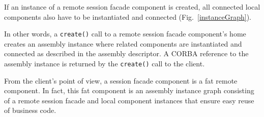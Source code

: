 If an instance of a remote session facade component is created, all connected local 
components also have to be instantiated and connected (Fig.~\ref{instanceGraph}). 

In other words, a {\tt create()} call to a remote session facade component's home 
creates an assembly instance where related components are instantiated and connected 
as described in the assembly descriptor. 
A CORBA reference to the assembly instance is returned by the {\tt create()} 
call to the client.

From the client's point of view, a session facade component is a fat remote
component. In fact, this fat component is an assembly instance graph consisting of
a remote session facade and local component instances that ensure easy reuse of 
business code.

